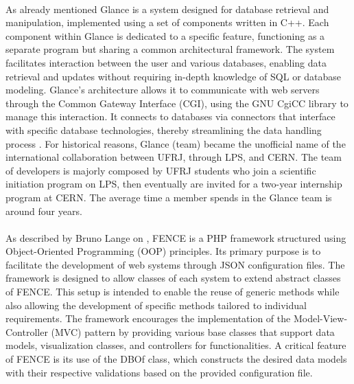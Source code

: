 \paragraph{}As already mentioned Glance is a system designed for database retrieval and manipulation, implemented using a set of components written in C++. Each component within Glance is dedicated to a specific feature, functioning as a separate program but sharing a common architectural framework. The system facilitates interaction between the user and various databases, enabling data retrieval and updates without requiring in-depth knowledge of SQL or database modeling. Glance's architecture allows it to communicate with web servers through the Common Gateway Interface (CGI), using the GNU CgiCC library to manage this interaction. It connects to databases via connectors that interface with specific database technologies, thereby streamlining the data handling process \cite{maidantchikGlanceProject}. For historical reasons, Glance (team) became the unofficial name of the international collaboration between UFRJ, through LPS, and CERN. The team of developers is majorly composed by UFRJ students who join a scientific initiation program on LPS, then eventually are invited for a two-year internship program at CERN. The average time a member spends in the Glance team is around four years. %

\paragraph{} As described by Bruno Lange on \cite{fence-2015}, FENCE is a PHP framework structured using Object-Oriented Programming (OOP) principles. Its primary purpose is to facilitate the development of web systems through JSON configuration files. The framework is designed to allow classes of each system to extend abstract classes of FENCE. This setup is intended to enable the reuse of generic methods while also allowing the development of specific methods tailored to individual requirements. The framework encourages the implementation of the Model-View-Controller (MVC) pattern by providing various base classes that support data models, visualization classes, and controllers for functionalities. A critical feature of FENCE is its use of the DBOf class, which constructs the desired data models with their respective validations based on the provided configuration file.

